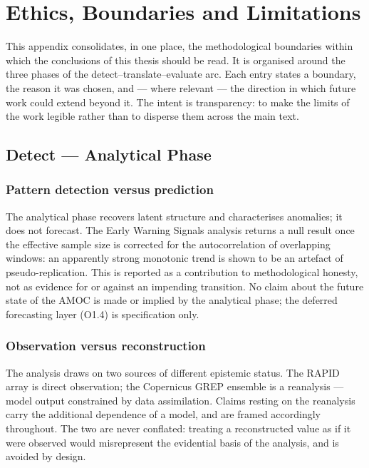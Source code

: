 
\chapter{Ethics, Boundaries and Limitations}
\label{app:ethics}

This appendix consolidates, in one place, the methodological boundaries within which the conclusions of this thesis should be read. It is organised around the three phases of the detect--translate--evaluate arc. Each entry states a boundary, the reason it was chosen, and --- where relevant --- the direction in which future work could extend beyond it. The intent is transparency: to make the limits of the work legible rather than to disperse them across the main text.

\section{Detect --- Analytical Phase}
\label{app:limits-detect}

\subsection*{Pattern detection versus prediction}
The analytical phase recovers latent structure and characterises anomalies; it does not forecast. The Early Warning Signals analysis returns a null result once the effective sample size is corrected for the autocorrelation of overlapping windows: an apparently strong monotonic trend is shown to be an artefact of pseudo-replication. This is reported as a contribution to methodological honesty, not as evidence for or against an impending transition. No claim about the future state of the AMOC is made or implied by the analytical phase; the deferred forecasting layer (O1.4) is specification only.

\subsection*{Observation versus reconstruction}
The analysis draws on two sources of different epistemic status. The RAPID array is direct observation; the Copernicus GREP ensemble is a reanalysis --- model output constrained by data assimilation. Claims resting on the reanalysis carry the additional dependence of a model, and are framed accordingly throughout. The two are never conflated: treating a reconstructed value as if it were observed would misrepresent the evidential basis of the analysis, and is avoided by design.

